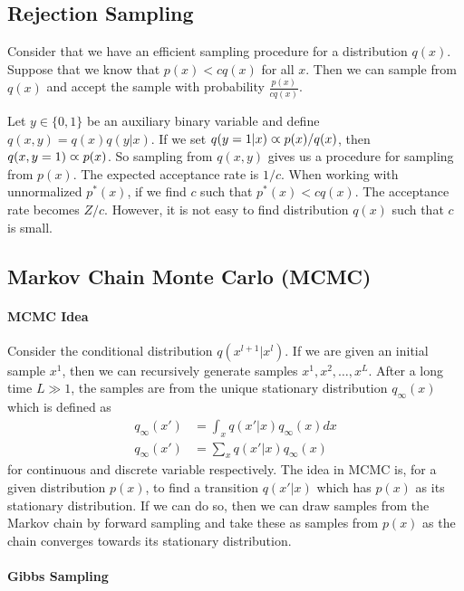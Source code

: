 \subsection{Rejection Sampling}

Consider that we have an efficient sampling procedure for a distribution $q(x)$. Suppose that we know that $p(x)<cq(x)$ for all $x$. Then we can sample from $q(x)$ and accept the sample with probability $\frac{p(x)}{cq(x)}$.

Let $y\in\{0,1\}$ be an auxiliary binary variable and define $q(x,y)=q(x)q(y|x)$. If we set $q(y=1|x)\varpropto p(x)/q(x)$, then $q(x,y=1)\varpropto p(x)$. So sampling from $q(x,y)$ gives us a procedure for sampling from $p(x)$. The expected acceptance rate is $1/c$. When working with unnormalized $p^*(x)$, if we find $c$ such that $p^*(x)<cq(x)$. The acceptance rate becomes $Z/c$. However, it is not easy to find distribution $q(x)$ such that $c$ is small.

\subsection{Markov Chain Monte Carlo (MCMC)}

\paragraph{MCMC Idea}

Consider the conditional distribution $q(x^{l+1}|x^l)$. If we are given an initial sample $x^1$, then we can recursively generate samples $x^1,x^2,\dotsc,x^L$. After a long time $L\gg 1$, the samples are from the unique stationary distribution $q_\infty(x)$ which is defined as
\begin{align*}
	q_\infty(x')&=\int_xq(x'|x)q_\infty(x)dx \\
	q_\infty(x')&=\sum_xq(x'|x)q_\infty(x)
\end{align*}
for continuous and discrete variable respectively. The idea in MCMC is, for a given distribution $p(x)$, to find a transition $q(x'|x)$ which has $p(x)$ as its stationary distribution. If we can do so, then we can draw samples from the Markov chain by forward sampling and take these as samples from $p(x)$ as the chain converges towards its stationary distribution.

\paragraph{Gibbs Sampling}

